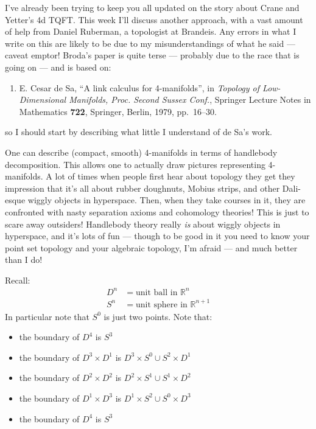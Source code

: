 \documentclass[12pt]{article}
\def\tightlist{}
\begin{document}
I've already been trying to keep you all updated on the story about
Crane and Yetter's 4d TQFT. This week I'll discuss another approach,
with a vast amount of help from Daniel Ruberman, a topologist at
Brandeis. Any errors in what I write on this are likely to be due to my
misunderstandings of what he said --- caveat emptor! Broda's paper is
quite terse --- probably due to the race that is going on --- and is
based on:

\begin{enumerate}
\def\labelenumi{\arabic{enumi})}
\setcounter{enumi}{2}
\item
E. Cesar de Sa, ``A link calculus for 4-manifolds'', in \emph{Topology
of Low-Dimensional Manifolds, Proc. Second Sussex Conf.}, Springer Lecture
Notes in Mathematics \textbf{722}, Springer, Berlin, 1979, pp.~16--30.
\end{enumerate}
\noindent
so I should start by describing what little I understand of de Sa's
work.

One can describe (compact, smooth) 4-manifolds in terms of handlebody
decomposition. This allows one to actually draw pictures representing
4-manifolds. A lot of times when people first hear about topology they
get they impression that it's all about rubber doughnuts, Mobius strips,
and other Dali-esque wiggly objects in hyperspace. Then, when they take
courses in it, they are confronted with nasty separation axioms and
cohomology theories! This is just to scare away outsiders! Handlebody
theory really \emph{is} about wiggly objects in hyperspace, and it's
lots of fun --- though to be good in it you need to know your point set
topology and your algebraic topology, I'm afraid --- and much better
than I do!

Recall:
\[\begin{aligned}D^n &= \mbox{unit ball in $\mathbb{R}^n$} \\ S^n &= \mbox{unit sphere in $\mathbb{R}^{n+1}$}\end{aligned}\]
In particular note that \(S^0\) is just two points. Note that:

\begin{itemize}
\tightlist
\item
  the boundary of \(D^4\) is \(S^3\)
\item
  the boundary of \(D^3 \times D^1\) is
  \(D^3 \times S^0 \cup S^2 \times D^1\)
\item
  the boundary of \(D^2 \times D^2\) is
  \(D^2 \times S^1 \cup S^1 \times D^2\)
\item
  the boundary of \(D^1 \times D^3\) is
  \(D^1 \times S^2 \cup S^0 \times D^3\)
\item
  the boundary of \(D^4\) is \(S^3\)
\end{itemize}
\end{document}
